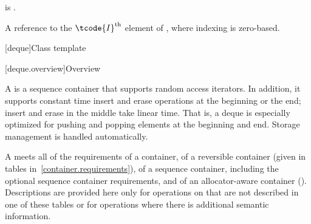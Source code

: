 \begin{itemdescr}
\pnum
\mandates
{} is .

\pnum
\returns
A reference to the $\tcode{I}^\text{th}$ element of ,
where indexing is zero-based.
\end{itemdescr}

[deque]{Class template }

[deque.overview]{Overview}

\pnum
A
%
is a sequence container that supports random access iterators.
In addition, it supports constant time insert and erase operations at the beginning or the end;
insert and erase in the middle take linear time.
That is, a deque is especially optimized for pushing and popping elements at the beginning and end.
Storage management is handled automatically.

\pnum
A
meets all of the requirements of a container, of a reversible container
(given in tables in~\ref{container.requirements}), of a sequence container,
including the optional sequence container requirements, and of an allocator-aware container ().
Descriptions are provided here only for operations on
that are not described in one of these tables
or for operations where there is additional semantic information.

